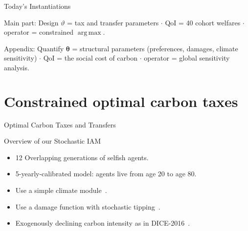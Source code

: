 \documentclass[10pt,aspectratio=169]{beamer}
\DeclareMathOperator*{\argmax}{arg\,max}
\begin{document}
\begin{frame}{Today's Instantiations}
\begin{block}{Main part: Design}
$\vartheta$ = tax and transfer parameters $\cdot$ QoI = 40 cohort welfares $\cdot$ operator = constrained $\argmax$.
\end{block}
\vspace{0.8em}
\begin{block}{Appendix: Quantify}
$\bm{\theta}$ = structural parameters (preferences, damages, climate sensitivity) $\cdot$ QoI = the social cost of carbon $\cdot$ operator = global sensitivity analysis.
\end{block}
\end{frame}

\section{Constrained optimal carbon taxes}

{
\begin{frame}
\Huge \textcolor{uzhblue}{Optimal Carbon Taxes and Transfers}
\end{frame}}

\begin{frame}[fragile]{Overview of our Stochastic IAM}
\begin{itemize}
    \item 12 Overlapping generations of selfish agents.
            \vspace{0.4cm}
    \item 5-yearly-calibrated model: agents live from age 20 to age 80.
            \vspace{0.4cm}
    \item Use a simple climate module~\citep{Dietz2020}.
            \vspace{0.4cm}
    \item Use a damage function with stochastic tipping~\citep{kotlikoffParetoimprovingCarbonriskTaxation2021a}.
            \vspace{0.4cm}
    \item Exogenously declining carbon intensity as in DICE-2016~\citep{nordhaus2017revisiting}.
\end{itemize}
\end{frame}
\end{document}
